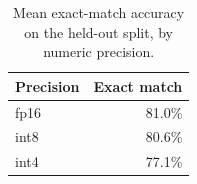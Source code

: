 \begin{table}[htbp]
\centering
\caption{Mean exact-match accuracy on the held-out split, by numeric precision.}
\label{tab:accuracy-by-precision}
\begin{tabular}{lr}
\toprule
Precision & Exact match \\
\midrule
fp16 & 81.0\% \\
int8 & 80.6\% \\
int4 & 77.1\% \\
\bottomrule
\end{tabular}
\end{table}
